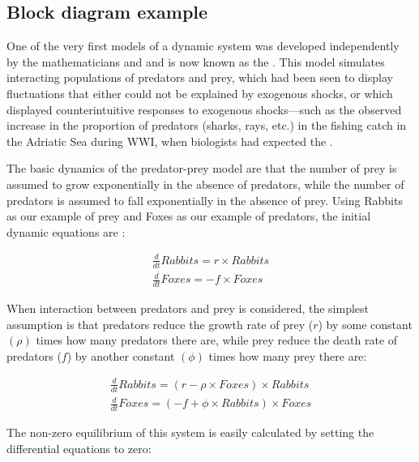 \subsection{Block diagram example}

One of the very first models of a dynamic system was developed independently
by the mathematicians 
and 
and is now known as the .
This model simulates interacting populations of predators and prey,
which had been seen to display fluctuations that either could not
be explained by exogenous shocks, or which displayed counterintuitive
responses to exogenous shocks---such as the observed increase in
the proportion of predators (sharks, rays, etc.) in the fishing catch
in the Adriatic Sea during WWI, when biologists had expected the .

The basic dynamics of the predator-prey model are that the number
of prey is assumed to grow exponentially in the absence of predators,
while the number of predators is assumed to fall exponentially in
the absence of prey. Using Rabbits as our example of prey and Foxes
as our example of predators, the initial dynamic equations are :

\[
\begin{array}{c}
\frac{d}{dt}Rabbits=r\times Rabbits\\
\frac{d}{dt}Foxes=-f\times Foxes
\end{array}
\]

When interaction between predators and prey is considered, the simplest
assumption is that predators reduce the growth rate of prey ($r$) by
some constant $\left(\rho\right)$ times how many predators there
are, while prey reduce the death rate of predators ($f$) by another
constant $\left(\phi\right)$ times how many prey there are:

\[
\begin{array}{c}
\frac{d}{dt}Rabbits=\left(r-\rho\times Foxes\right)\times Rabbits\\
\frac{d}{dt}Foxes=\left(-f+\phi\times Rabbits\right)\times Foxes
\end{array}
\]

The non-zero equilibrium of this system is easily calculated by setting
the differential equations to zero:

